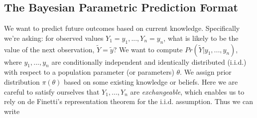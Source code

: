 \documentclass[12pt, a4paper]{article}
\begin{document}
\clearpage

  \subsection{The Bayesian Parametric Prediction Format}

  We want to predict future outcomes based on current knowledge.  Specifically we're asking: for observed values $Y_1 = y_1,...,Y_n = y_n$, what is likely to be the value of the next observation, $\tilde{Y}=\tilde{y}$?  We want to compute $Pr(\tilde{Y}|y_1,...,y_n)$, where $y_1,...,y_n$ are conditionally independent and identically distributed (i.i.d.) with respect to a population parameter (or parameters) $\theta$.  We assign prior distribution $\pi(\theta)$ based on some existing knowledge or beliefs.  Here we are careful to satisfy ourselves that $Y_1,...,Y_n$ are \textit{exchangeable}, which enables us to rely on de Finetti's representation theorem for the i.i.d. assumption.  Thus we can write

\end{document}
